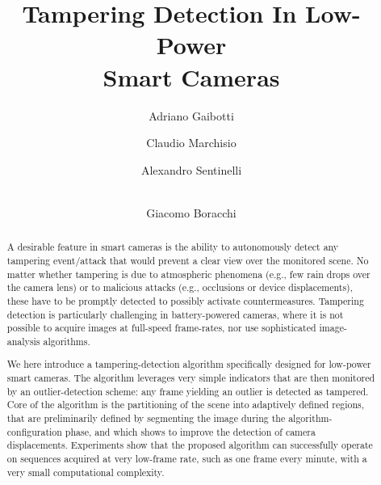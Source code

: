 \documentclass{llncs}
\begin{document}
\title{Tampering Detection In Low-Power \\ Smart Cameras}

\author{Adriano Gaibotti \and Claudio Marchisio \and Alexandro Sentinelli \and \\ Giacomo Boracchi}

\maketitle

\begin{abstract}
A desirable feature in smart cameras is the ability to autonomously detect any tampering event/attack that would prevent a clear view over the monitored scene. No matter whether tampering is due to atmospheric phenomena (e.g., few rain drops over the camera lens) or to malicious attacks (e.g., occlusions or device displacements), these have to be promptly detected to possibly activate countermeasures. Tampering detection is particularly challenging in battery-powered cameras, where it is not possible to acquire images at full-speed frame-rates, nor use sophisticated image-analysis algorithms. 

We here introduce a tampering-detection algorithm specifically designed for low-power smart cameras. The algorithm leverages very simple indicators that are then monitored by an outlier-detection scheme: any frame yielding an outlier is detected as tampered. Core of the algorithm is the partitioning of the scene into adaptively defined regions, that are preliminarily defined by segmenting the image during the algorithm-configuration phase, and which shows to improve the detection of camera displacements. Experiments show that the proposed algorithm can successfully operate on sequences acquired at very low-frame rate, such as one frame every minute, with a very small computational complexity. %
\end{abstract}
\end{document}

